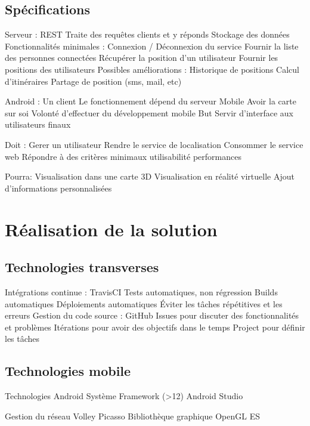 \documentclass{beamer} %
\begin{document}
  \subsection{Spécifications}
  \begin{frame}{\subsecname}
    Serveur :
    REST
    Traite des requêtes clients et y réponds
    Stockage des données
    Fonctionnalités minimales :
    Connexion / Déconnexion du service
    Fournir la liste des personnes connectées
    Récupérer la position  d’un utilisateur
    Fournir les positions des utilisateurs
    Possibles améliorations :
    Historique de positions
    Calcul d’itinéraires
    Partage de position (sms, mail, etc)
  \end{frame}

  \begin{frame}{\subsecname}
    Android :
    Un client
    Le fonctionnement dépend du serveur
    Mobile
      Avoir la carte sur soi
      Volonté d'effectuer du développement mobile
    But
      Servir d'interface aux utilisateurs finaux

    Doit :
    Gerer un utilisateur
    Rendre le service de localisation
    Consommer le service web
    Répondre à des critères minimaux
      utilisabilité
      performances

    Pourra:
    Visualisation dans une carte 3D
    Visualisation en réalité virtuelle
    Ajout d'informations personnalisées
  \end{frame}


  \section{Réalisation de la solution}
  \subsection{Technologies transverses}
  \begin{frame}{\subsecname}
    Intégrations continue :
    TravisCI
    Tests automatiques, non régression
    Builds automatiques
    Déploiements automatiques
    Éviter les tâches répétitives et les erreurs
    Gestion du code source :
    GitHub
    Issues pour discuter des fonctionnalités et problèmes
    Itérations pour avoir des objectifs dans le temps
    Project pour définir les tâches  
  \end{frame}

  \subsection{Technologies mobile}
  \begin{frame}{\subsecname}
    Technologies
    Android
    Système
    Framework (>12)
    Android Studio

    Gestion du réseau
    Volley
    Picasso
    Bibliothèque graphique
    OpenGL ES
  \end{frame}
\end{document}
